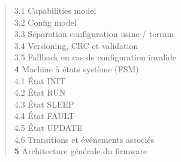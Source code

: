\begin{quote}
\hspace{2.5em} 3.1 \hspace{0.5em} Capabilities model \dotfill \pageref{subsec:cap_model}\\
\hspace{2.5em} 3.2 \hspace{0.5em} Config model \dotfill \pageref{subsec:config_model}\\
\hspace{2.5em} 3.3 \hspace{0.5em} Séparation configuration usine / terrain \dotfill \pageref{subsec:sep_config}\\
\hspace{2.5em} 3.4 \hspace{0.5em} Versioning, CRC et validation \dotfill \pageref{subsec:versioning}\\
\hspace{2.5em} 3.5 \hspace{0.5em} Fallback en cas de configuration invalide \dotfill \pageref{subsec:fallback}\\
\textbf{4} \hspace{1em} Machine à états système (FSM) \dotfill \pageref{sec:fsm}\\
\hspace{2.5em} 4.1 \hspace{0.5em} État INIT \dotfill \pageref{subsec:fsm_init}\\
\hspace{2.5em} 4.2 \hspace{0.5em} État RUN \dotfill \pageref{subsec:fsm_run}\\
\hspace{2.5em} 4.3 \hspace{0.5em} État SLEEP \dotfill \pageref{subsec:fsm_sleep}\\
\hspace{2.5em} 4.4 \hspace{0.5em} État FAULT \dotfill \pageref{subsec:fsm_fault}\\
\hspace{2.5em} 4.5 \hspace{0.5em} État UPDATE \dotfill \pageref{subsec:fsm_update}\\
\hspace{2.5em} 4.6 \hspace{0.5em} Transitions et événements associés \dotfill \pageref{subsec:fsm_trans}\\
\textbf{5} \hspace{1em} Architecture générale du firmware \dotfill \pageref{sec:archi_gen}\\

\end{quote}
